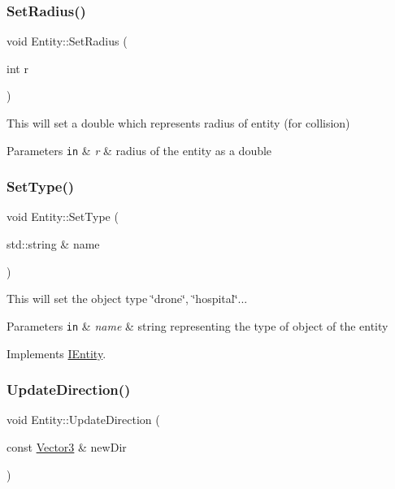\subsubsection{\texorpdfstring{Set\+Radius()}{SetRadius()}}
{\footnotesize\ttfamily void Entity\+::\+Set\+Radius (\begin{DoxyParamCaption}\item[{int}]{r }\end{DoxyParamCaption})}



This will set a double which represents radius of entity (for collision) 


\begin{DoxyParams}[1]{Parameters}
\mbox{\tt in}  & {\em r} & radius of the entity as a double \\
\hline
\end{DoxyParams}
\mbox{\label{classEntity_a8d956360ddbff29834d22855a785fe6c}} 
\subsubsection{\texorpdfstring{Set\+Type()}{SetType()}}
{\footnotesize\ttfamily void Entity\+::\+Set\+Type (\begin{DoxyParamCaption}\item[{std\+::string \&}]{name }\end{DoxyParamCaption})\hspace{0.3cm}{\ttfamily [virtual]}}



This will set the object type \char`\"{}drone\char`\"{}, \char`\"{}hospital\char`\"{}... 


\begin{DoxyParams}[1]{Parameters}
\mbox{\tt in}  & {\em name} & string representing the type of object of the entity \\
\hline
\end{DoxyParams}


Implements \hyperlink{classIEntity_a49b3c54f94a93d4a9f96527ffb8982f5}{I\+Entity}.

\mbox{\label{classEntity_a6ae8474b6eb3684f3977dcb5406a3d11}} 
\subsubsection{\texorpdfstring{Update\+Direction()}{UpdateDirection()}}
{\footnotesize\ttfamily void Entity\+::\+Update\+Direction (\begin{DoxyParamCaption}\item[{const \hyperlink{classVector3}{Vector3} \&}]{new\+Dir }\end{DoxyParamCaption})\hspace{0.3cm}{\ttfamily [virtual]}}



